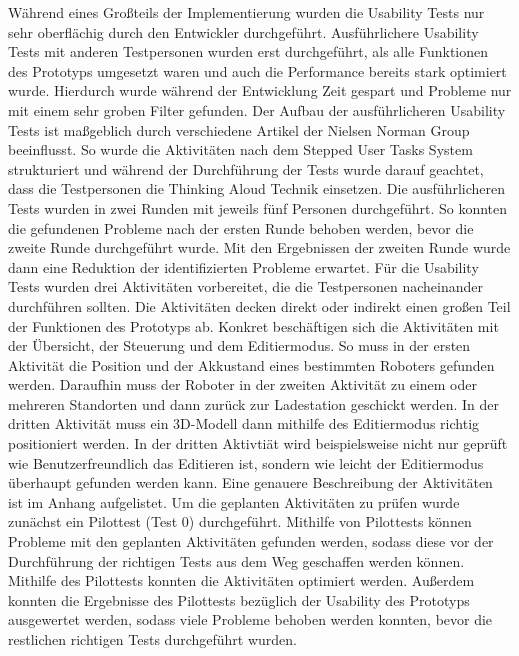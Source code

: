 Während eines Großteils der Implementierung wurden die Usability Tests nur sehr oberflächig durch den Entwickler durchgeführt. Ausführlichere Usability Tests mit anderen Testpersonen wurden erst durchgeführt, als alle Funktionen des Prototyps umgesetzt waren und auch die Performance bereits stark optimiert wurde. Hierdurch wurde während der Entwicklung Zeit gespart und Probleme nur mit einem sehr groben Filter gefunden. 
Der Aufbau der ausführlicheren Usability Tests ist maßgeblich durch verschiedene Artikel der Nielsen Norman Group beeinflusst. So wurde die Aktivitäten nach dem Stepped User Tasks System strukturiert und während der Durchführung der Tests wurde darauf geachtet, dass die Testpersonen die Thinking Aloud Technik einsetzen.
Die ausführlicheren Tests wurden in zwei Runden mit jeweils fünf Personen durchgeführt. So konnten die gefundenen Probleme nach der ersten Runde behoben werden, bevor die zweite Runde durchgeführt wurde. Mit den Ergebnissen der zweiten Runde wurde dann eine Reduktion der identifizierten Probleme erwartet. Für die Usability Tests wurden drei Aktivitäten vorbereitet, die die Testpersonen nacheinander durchführen sollten. Die Aktivitäten decken direkt oder indirekt einen großen Teil der Funktionen des Prototyps ab. Konkret beschäftigen sich die Aktivitäten mit der Übersicht, der Steuerung und dem Editiermodus. So muss in der ersten Aktivität die Position und der Akkustand eines bestimmten Roboters gefunden werden. Daraufhin muss der Roboter in der zweiten Aktivität zu einem oder mehreren Standorten und dann zurück zur Ladestation geschickt werden. In der dritten Aktivität muss ein 3D-Modell dann mithilfe des Editiermodus richtig positioniert werden. In der dritten Aktivtiät wird beispielsweise nicht nur geprüft wie Benutzerfreundlich das Editieren ist, sondern wie leicht der Editiermodus überhaupt gefunden werden kann. Eine genauere Beschreibung der Aktivitäten ist im Anhang aufgelistet.
Um die geplanten Aktivitäten zu prüfen wurde zunächst ein Pilottest (Test 0) durchgeführt.
Mithilfe von Pilottests können Probleme mit den geplanten Aktivitäten gefunden werden, sodass diese vor der Durchführung der richtigen Tests aus dem Weg geschaffen werden können.
Mithilfe des Pilottests konnten die Aktivitäten optimiert werden. Außerdem konnten die Ergebnisse des Pilottests bezüglich der Usability des Prototyps ausgewertet werden, sodass viele Probleme behoben werden konnten, bevor die restlichen richtigen Tests durchgeführt wurden.

